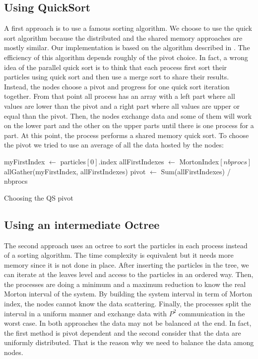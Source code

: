 \documentclass[12pt,letterpaper,titlepage]{report}
\begin{document}
\subsection{Using QuickSort}
A first approach is to use a famous sorting algorithm.
We choose to use the quick sort algorithm because the distributed and the shared memory approaches are mostly similar.
Our implementation is based on the algorithm described in \cite{itpc03}.
The efficiency of this algorithm depends roughly of the pivot choice.
In fact, a wrong idea of the parallel quick sort is to think that each process first sort their particles using quick sort and then use a merge sort to share their results.
Instead, the nodes choose a pivot and progress for one quick sort iteration together.
From that point all process has an array with a left part where all values are lower than the pivot and a right part where all values are upper or equal than the pivot.
Then, the nodes exchange data and some of them will work on the lower part and the other on the upper parts until there is one process for a part.
At this point, the process performs a shared memory quick sort.
To choose the pivot we tried to use an average of all the data hosted by the nodes:
\newline
\begin{algorithm}[H]
\linesnumbered
\SetLine
{}
\BlankLine
myFirstIndex $\leftarrow$ particles$[0]$.index\;
allFirstIndexes $\leftarrow$ MortonIndex$[nbprocs]$\;
allGather(myFirstIndex, allFirstIndexes)\;
pivot $\leftarrow$ Sum(allFirstIndexes) / nbprocs\;
\BlankLine
\caption{Choosing the QS pivot}
\end{algorithm}
\subsection{Using an intermediate Octree}
The second approach uses an octree to sort the particles in each process instead of a sorting algorithm.
The time complexity is equivalent but it needs more memory since it is not done in place.
After inserting the particles in the tree, we can iterate at the leaves level and access to the particles in an ordered way.
Then, the processes are doing a minimum and a maximum reduction to know the real Morton interval of the system.
By building the system interval in term of Morton index, the nodes cannot know the data scattering.
Finally, the processes split the interval in a uniform manner and exchange data with $P^{2}$ communication in the worst case.
\newline
\newline
In both approaches the data may not be balanced at the end.
In fact, the first method is pivot dependent and the second consider that the data are uniformly distributed.
That is the reason why we need to balance the data among nodes.
\end{document}
